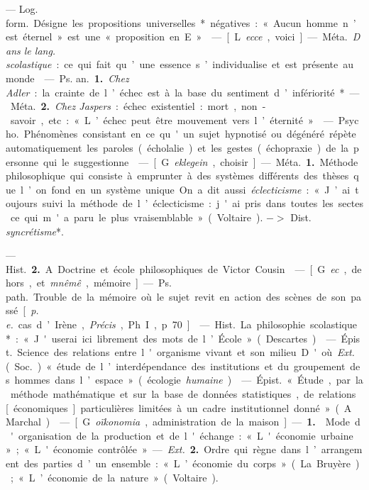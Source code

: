 
	\begin{itemize}[leftmargin=1cm, label=, itemsep=1pt]

 — \si{Log. form.} Désigne les propositions universelles* négatives :
« Aucun homme n’est éternel » est une « proposition en E ».

 — [L. {\it ecce}, voici] — \si{Méta.} {\it Dans
le lang. scolastique} : ce qui fait qu’une
essence s’individualise et est présente au monde.

 — \si{Ps. an.} {\bf 1.} {\it Chez Adler} : la
crainte de l’échec est à la base du sentiment d’infériorité*. — \si{Méta.}
 {\bf 2.} {\it Chez Jaspers} : échec existentiel :
mort, non-savoir, etc. : « L’échec peut être mouvement vers l’éternité. »

 — \si{Psycho.}
Phénomènes consistant en ce qu'un sujet hypnotisé ou dégénéré répète
automatiquement les paroles (écholalie) et les gestes (échopraxie) de la
personne qui le suggestionne.

 — [G. {\it eklegein}, choisir] —
\si{Méta.} {\bf 1.} Méthode philosophique qui
consiste à emprunter à des systèmes différents des thèses que l’on fond
en un système unique. On a dit aussi
{\it éclecticisme} : « J’ai toujours suivi la
méthode de l’éclecticisme : j'ai pris dans toutes les sectes ce qui m'a
paru le plus vraisemblable » (Voltaire). $->$ Dist. {\it syncrétisme}*.

— \si{Hist.} {\bf 2.} A. Doctrine et école
philosophiques de Victor Cousin.

 — [G. {\it ec}, dehors, et {\it mnêmê},
mémoire] — \si{Ps. path.} Trouble de la mémoire
où le sujet revit en action
des scènes de son passé [{\it p. e.} cas
d’Irène,  {\it Précis}, Ph. I, p. 70].

 — \si{Hist.} La philosophie scolastique* :
« J'userai ici librement des mots de l’École » (Descartes).

 — \si{Épist.} Science des relations entre l'organisme vivant et
son milieu. D'où {\it Ext.} (\si{Soc.}) « étude
de l’interdépendance des institutions
et du groupement des hommes dans
l’espace » (écologie {\it humaine}).

 — \si{Épist.} « Étude, par la
méthode mathématique et sur la
base de données statistiques, de
relations [économiques] particulières limitées à un cadre institutionnel donné ». (A. Marchal).

 — [G. {\it oïkonomia}, administration de la maison]
— {\bf 1.}  Mode d'organisation de la production et
de l'échange : « L'économie urbaine » ;
« L'économie contrôlée ». — {\it Ext.} {\bf 2.}
Ordre qui règne dans l’arrangement
des parties d’un ensemble : « L’économie du corps » (La Bruyère);
« L’économie de la nature » (Voltaire).


\end{itemize}

